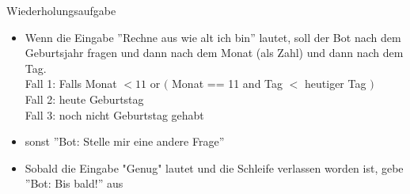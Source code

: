 \begin{frame}[fragile]{Wiederholungsaufgabe}

\begin{itemize}
	\item Wenn die Eingabe ''Rechne aus wie alt ich bin'' lautet, soll der Bot nach dem Geburtsjahr fragen und dann nach dem Monat (als Zahl) und dann nach dem Tag. \\Fall 1: Falls Monat $<11$ or $($ Monat == 11 and Tag $<$ heutiger Tag $)$ \\
	Fall 2: heute Geburtstag\\
	Fall 3: noch nicht Geburtstag gehabt
	\item sonst ''Bot: Stelle mir eine andere Frage'' 
	\item Sobald die Eingabe "Genug" lautet und die Schleife verlassen worden ist, gebe ''Bot: Bis bald!'' aus
	\end{itemize}
\end{frame}
